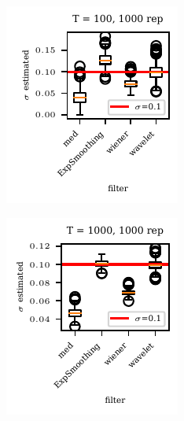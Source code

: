 \documentclass[oneside]{article}
\theoremstyle{plain}%
\theoremstyle{definition}
\begin{document}
\begin{figure}
    \begin{subfigure}{0.48\textwidth}
        \includegraphics[width=\textwidth]{plots/std_estimation/std_estimation_boxplot_100.pdf}
    \end{subfigure}
    \begin{subfigure}{0.48\textwidth}
        \includegraphics[width=\textwidth]{plots/std_estimation/std_estimation_boxplot_1000.pdf}
    \end{subfigure}


\end{figure}
\end{document}
